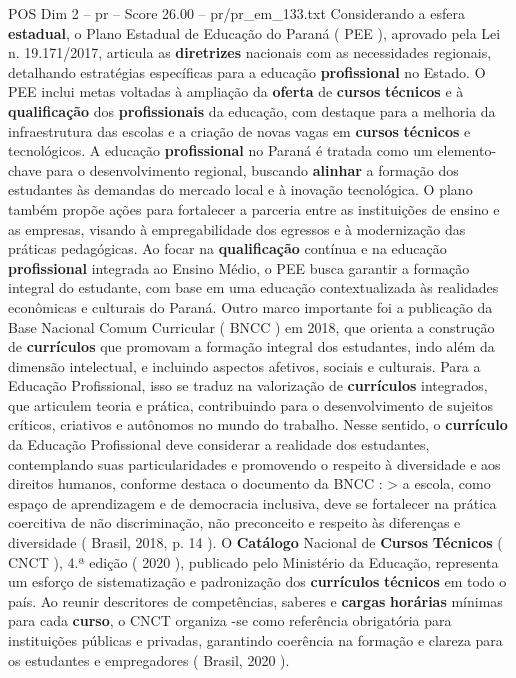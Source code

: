 \begin{textsample}{POS Dim 2 – pr – Score 26.00 – pr/pr\_em\_133.txt}
Considerando a esfera \textbf{estadual}, o Plano Estadual de Educação do Paraná ( PEE ), aprovado pela Lei n. 19.171/2017, articula as \textbf{diretrizes} nacionais com as necessidades regionais, detalhando estratégias específicas para a educação \textbf{profissional} no Estado.
O PEE inclui metas voltadas à ampliação da \textbf{oferta} de \textbf{cursos} \textbf{técnicos} e à \textbf{qualificação} dos \textbf{profissionais} da educação, com destaque para a melhoria da infraestrutura das escolas e a criação de novas vagas em \textbf{cursos} \textbf{técnicos} e tecnológicos.
A educação \textbf{profissional} no Paraná é tratada como um elemento-chave para o desenvolvimento regional, buscando \textbf{alinhar} a formação dos estudantes às demandas do mercado local e à inovação tecnológica.
O plano também propõe ações para fortalecer a parceria entre as instituições de ensino e as empresas, visando à empregabilidade dos egressos e à modernização das práticas pedagógicas.
Ao focar na \textbf{qualificação} contínua e na educação \textbf{profissional} integrada ao Ensino Médio, o PEE busca garantir a formação integral do estudante, com base em uma educação contextualizada às realidades econômicas e culturais do Paraná.
Outro marco importante foi a publicação da Base Nacional Comum Curricular ( BNCC ) em 2018, que orienta a construção de \textbf{currículos} que promovam a formação integral dos estudantes, indo além da dimensão intelectual, e incluindo aspectos afetivos, sociais e culturais.
Para a Educação Profissional, isso se traduz na valorização de \textbf{currículos} integrados, que articulem teoria e prática, contribuindo para o desenvolvimento de sujeitos críticos, criativos e autônomos no mundo do trabalho.
Nesse sentido, o \textbf{currículo} da Educação Profissional deve considerar a realidade dos estudantes, contemplando suas particularidades e promovendo o respeito à diversidade e aos direitos humanos, conforme destaca o documento da BNCC : > a escola, como espaço de aprendizagem e de democracia inclusiva, deve se fortalecer na prática coercitiva de não discriminação, não preconceito e respeito às diferenças e diversidade ( Brasil, 2018, p. 14 ).
O \textbf{Catálogo} Nacional de \textbf{Cursos} \textbf{Técnicos} ( CNCT ), 4.ª edição ( 2020 ), publicado pelo Ministério da Educação, representa um esforço de sistematização e padronização dos \textbf{currículos} \textbf{técnicos} em todo o país.
Ao reunir descritores de competências, saberes e \textbf{cargas} \textbf{horárias} mínimas para cada \textbf{curso}, o CNCT organiza -se como referência obrigatória para instituições públicas e privadas, garantindo coerência na formação e clareza para os estudantes e empregadores ( Brasil, 2020 ).

\end{textsample}
